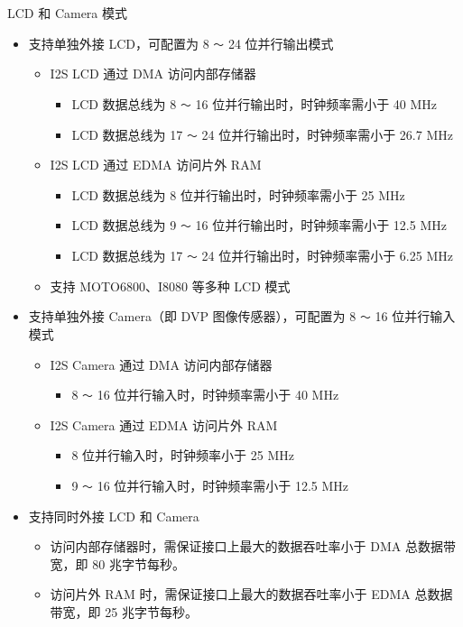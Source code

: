 \documentclass[main\_\_CN.tex]{subfiles}
\begin{document}
LCD 和 Camera 模式
\begin{itemize}
    \item 支持单独外接 LCD，可配置为 8 \verb+～+ 24 位并行输出模式
    \begin{itemize}
        \item I2S LCD 通过 DMA 访问内部存储器
            \begin{itemize}
            \item LCD 数据总线为 8 \verb+～+ 16 位并行输出时，时钟频率需小于 40 MHz
            \item LCD 数据总线为 17 \verb+～+ 24 位并行输出时，时钟频率需小于 26.7 MHz
            \end{itemize}

        \item I2S LCD 通过 EDMA 访问片外 RAM
            \begin{itemize}
            \item LCD 数据总线为 8 位并行输出时，时钟频率需小于 25 MHz
            \item LCD 数据总线为 9 \verb+～+ 16 位并行输出时，时钟频率需小于 12.5 MHz
            \item LCD 数据总线为 17 \verb+～+ 24 位并行输出时，时钟频率需小于 6.25 MHz
            \end{itemize}
        \item 支持 MOTO6800、I8080 等多种 LCD 模式
    \end{itemize}

    \item 支持单独外接 Camera（即 DVP 图像传感器），可配置为 8 \verb+～+ 16 位并行输入模式
    \begin{itemize}
        \item I2S Camera 通过 DMA 访问内部存储器
            \begin{itemize}
            \item 8 \verb+～+ 16 位并行输入时，时钟频率需小于 40 MHz
            \end{itemize}
        \item I2S Camera 通过 EDMA 访问片外 RAM
            \begin{itemize}
            \item 8 位并行输入时，时钟频率小于 25 MHz
            \item 9 \verb+～+ 16 位并行输入时，时钟频率需小于 12.5 MHz
            \end{itemize}
    \end{itemize}

    \item 支持同时外接 LCD 和 Camera
    \begin{itemize}
        \item 访问内部存储器时，需保证接口上最大的数据吞吐率小于 DMA 总数据带宽，即 80 兆字节每秒。
        \item 访问片外 RAM 时，需保证接口上最大的数据吞吐率小于 EDMA 总数据带宽，即 25 兆字节每秒。
    \end{itemize}
\end{itemize}
\end{document}
